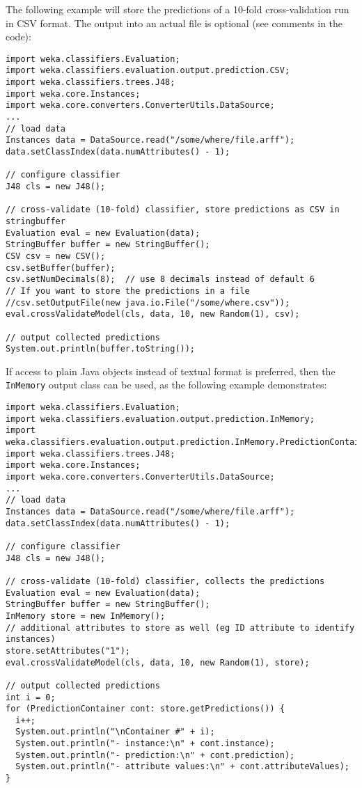 The following example will store the predictions of a 10-fold
cross-validation run in CSV format. The output into an actual file
is optional (see comments in the code):

\begin{verbatim}
import weka.classifiers.Evaluation;
import weka.classifiers.evaluation.output.prediction.CSV;
import weka.classifiers.trees.J48;
import weka.core.Instances;
import weka.core.converters.ConverterUtils.DataSource;
...
// load data
Instances data = DataSource.read("/some/where/file.arff");
data.setClassIndex(data.numAttributes() - 1);

// configure classifier
J48 cls = new J48();

// cross-validate (10-fold) classifier, store predictions as CSV in stringbuffer
Evaluation eval = new Evaluation(data);
StringBuffer buffer = new StringBuffer();
CSV csv = new CSV();
csv.setBuffer(buffer);
csv.setNumDecimals(8);  // use 8 decimals instead of default 6
// If you want to store the predictions in a file
//csv.setOutputFile(new java.io.File("/some/where.csv"));
eval.crossValidateModel(cls, data, 10, new Random(1), csv);

// output collected predictions
System.out.println(buffer.toString());
\end{verbatim}

If access to plain Java objects instead of textual format is preferred,
then the \texttt{InMemory} output class can be used, as the following
example demonstrates:

\begin{verbatim}
import weka.classifiers.Evaluation;
import weka.classifiers.evaluation.output.prediction.InMemory;
import weka.classifiers.evaluation.output.prediction.InMemory.PredictionContainer;
import weka.classifiers.trees.J48;
import weka.core.Instances;
import weka.core.converters.ConverterUtils.DataSource;
...
// load data
Instances data = DataSource.read("/some/where/file.arff");
data.setClassIndex(data.numAttributes() - 1);

// configure classifier
J48 cls = new J48();

// cross-validate (10-fold) classifier, collects the predictions
Evaluation eval = new Evaluation(data);
StringBuffer buffer = new StringBuffer();
InMemory store = new InMemory();
// additional attributes to store as well (eg ID attribute to identify instances)
store.setAttributes("1");  
eval.crossValidateModel(cls, data, 10, new Random(1), store);

// output collected predictions
int i = 0;
for (PredictionContainer cont: store.getPredictions()) {
  i++;
  System.out.println("\nContainer #" + i);
  System.out.println("- instance:\n" + cont.instance);
  System.out.println("- prediction:\n" + cont.prediction);
  System.out.println("- attribute values:\n" + cont.attributeValues);
}
\end{verbatim}

